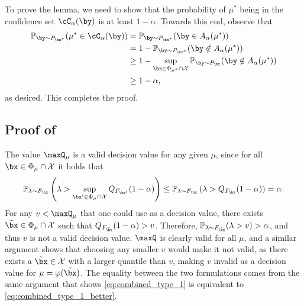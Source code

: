 \documentclass[11pt]{article}
\numberwithin{equation}{section}
\numberwithin{figure}{section}
\begin{document}
To prove the lemma, we need to show that the probability of \( \mu^* \) being in the confidence set \( \cC_\alpha(\by) \) is at least \( 1 - \alpha \). 
Towards this end, observe that
\begin{align*}
    \mathbb{P}_{\by \sim P_{\bx^*}} (\mu^* \in \cC_\alpha(\by)) &= \mathbb{P}_{\by \sim P_{\bx^*}} (\by \in A_\alpha(\mu^*))  \\
    &= 1 - \mathbb{P}_{\by \sim P_{\bx^*}} (\by \notin A_\alpha(\mu^*)) \\
    &\geq 1 - \sup_{\bx \in \Phi_{\mu^*} \cap \mathcal{X}} \mathbb{P}_{\by \sim P_{\bx}} (\by \notin A_\alpha(\mu^*))  \\
    &\geq 1 - \alpha,
\end{align*}
as desired.
This completes the proof.

\subsection{Proof of } \label{proof:lemma:quantile}

The value $\maxQ_\mu$ is a valid decision value for any given $\mu$, since for all $\bx \in \Phi_\mu \cap \mathcal X$ it holds that
\begin{equation}\label{eq:quantileproof-proof}
    \mathbb{P}_{\lambda \sim F_{\bx}} \left(\lambda > \sup_{\bx' \in \Phi_\mu \cap \mathcal{X}}Q_{F_{\bx'}}(1-\alpha) \right) \leq  \mathbb{P}_{\lambda \sim F_{\bx}} \left(\lambda > Q_{F_\bx}(1-\alpha) \right) = \alpha.
\end{equation}
For any $v < \maxQ_\mu$ that one could use as a decision value, there exists $\tilde{\bx} \in \Phi_\mu \cap \mathcal X$ such that $Q_{F_{\tilde{\bx}}}(1-\alpha) > v$. 
Therefore, $\mathbb{P}_{\lambda \sim F_{\tilde{\bx}}} (\lambda > v) > \alpha$, and thus $v$ is not a valid decision value. 
$\maxQ$ is clearly valid for all $\mu$, and a similar argument shows that choosing any smaller $v$ would make it not valid, as there exists a $\tilde{\bx} \in \mathcal{X}$ with a larger quantile than $v$, making $v$ invalid as a decision value for $\mu = \varphi(\tilde{\bx})$. 
The equality between the two formulations comes from the same argument that shows \eqref{eq:combined_type_1} is equivalent to \eqref{eq:combined_type_1_better}.
\end{document}
